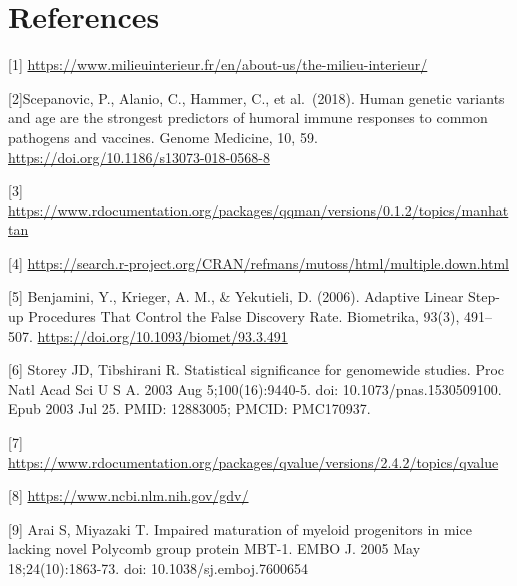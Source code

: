 \documentclass[
  12pt,
]{article}
\begin{document}
\section{References}\label{references}

{[}1{]}
\url{https://www.milieuinterieur.fr/en/about-us/the-milieu-interieur/}

{[}2{]}Scepanovic, P., Alanio, C., Hammer, C., et al.~(2018). Human
genetic variants and age are the strongest predictors of humoral immune
responses to common pathogens and vaccines. Genome Medicine, 10, 59.
\url{https://doi.org/10.1186/s13073-018-0568-8}

{[}3{]}
\url{https://www.rdocumentation.org/packages/qqman/versions/0.1.2/topics/manhattan}

{[}4{]}
\url{https://search.r-project.org/CRAN/refmans/mutoss/html/multiple.down.html}

{[}5{]} Benjamini, Y., Krieger, A. M., \& Yekutieli, D. (2006). Adaptive
Linear Step-up Procedures That Control the False Discovery Rate.
Biometrika, 93(3), 491--507.
\url{https://doi.org/10.1093/biomet/93.3.491}

{[}6{]} Storey JD, Tibshirani R. Statistical significance for genomewide
studies. Proc Natl Acad Sci U S A. 2003 Aug 5;100(16):9440-5. doi:
10.1073/pnas.1530509100. Epub 2003 Jul 25. PMID: 12883005; PMCID:
PMC170937.

{[}7{]}
\url{https://www.rdocumentation.org/packages/qvalue/versions/2.4.2/topics/qvalue}

{[}8{]} \url{https://www.ncbi.nlm.nih.gov/gdv/}

{[}9{]} Arai S, Miyazaki T. Impaired maturation of myeloid progenitors
in mice lacking novel Polycomb group protein MBT-1. EMBO J. 2005 May
18;24(10):1863-73. doi: 10.1038/sj.emboj.7600654
\end{document}
